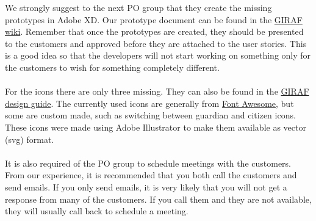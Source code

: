 \noindent
We strongly suggest to the next PO group that they create the missing prototypes in Adobe XD.
Our prototype document can be found in the \href{https://github.com/aau-giraf/wiki/tree/master/design_guide/prototypes}{GIRAF wiki}. 
Remember that once the prototypes are created, they should be presented to the customers and approved before they are attached to the user stories.
This is a good idea so that the developers will not start working on something only for the customers to wish for something completely different.
\\\\
For the icons there are only three missing. They can also be found in the \href{https://github.com/aau-giraf/wiki/blob/master/design_guide/icons.md}{GIRAF design guide}. 
The currently used icons are generally from \href{https://fontawesome.com/}{Font Awesome}, but some are custom made, such as switching between guardian and citizen icons.
These icons were made using Adobe Illustrator to make them available as vector (svg) format.
\\\\
It is also required of the PO group to schedule meetings with the customers.
From our experience, it is recommended that you both call the customers and send emails. 
If you only send emails, it is very likely that you will not get a response from many of the customers. 
If you call them and they are not available, they will usually call back to schedule a meeting.
